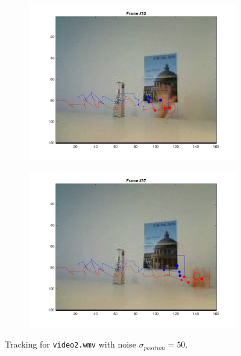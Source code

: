 \documentclass{ethz_report}
\begin{document}
\begin{figure}[h]
\begin{subfigure}[b]{.25\textwidth}
        \includegraphics[width=1\linewidth]{images/video2_noise_high_31}
    \end{subfigure}%
    \begin{subfigure}[b]{.25\textwidth}
        \centering
        \includegraphics[width=1\linewidth]{images/video2_noise_high_36}
    \end{subfigure}
    \caption{Tracking for \texttt{video2.wmv} with noise $\sigma_{position} = 50$.}
    \label{fig:tracking_video2_noise_high}
\end{figure}
\end{document}
